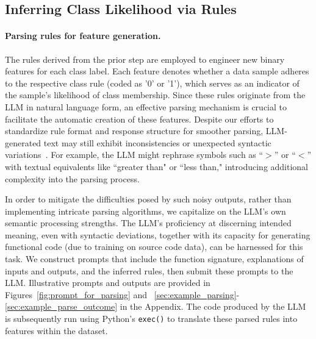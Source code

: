 \subsection{Inferring Class Likelihood via Rules}
\label{Sec:training}

\paragraph{Parsing rules for feature generation.} The rules derived from the prior step are employed to engineer new binary features for each class label. Each feature denotes whether a data sample adheres to the respective class rule (coded as '0' or '1'), which serves as an indicator of the sample's likelihood of class membership. Since these rules originate from the LLM in natural language form, an effective parsing mechanism is crucial to facilitate the automatic creation of these features. Despite our efforts to standardize rule format and response structure for smoother parsing, LLM-generated text may still exhibit inconsistencies or unexpected syntactic variations~\cite{kovavc2023large}. For example, the LLM might rephrase symbols such as ``$>$” or ``$<$” with textual equivalents like ``greater than" or ``less than," introducing additional complexity into the parsing process.

In order to mitigate the difficulties posed by such noisy outputs, rather than implementing intricate parsing algorithms, we capitalize on the LLM’s own semantic processing strengths. The LLM’s proficiency at discerning intended meaning, even with syntactic deviations, together with its capacity for generating functional code (due to training on source code data), can be harnessed for this task. We construct prompts that include the function signature, explanations of inputs and outputs, and the inferred rules, then submit these prompts to the LLM. Illustrative prompts and outputs are provided in Figures~\ref{fig:prompt_for_parsing} and ~\ref{sec:example_parsing}-\ref{sec:example_parse_outcome} in the Appendix. The code produced by the LLM is subsequently run using Python’s \texttt{exec()} to translate these parsed rules into features within the dataset.

\vspace*{-0.12in}
